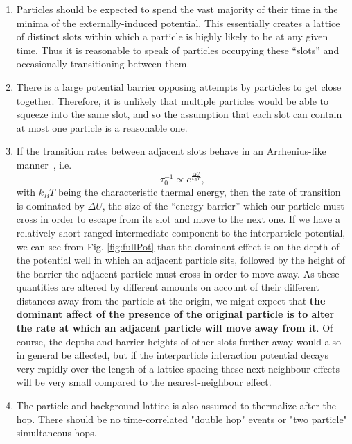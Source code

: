 \begin{enumerate}
\item Particles should be expected to spend the vast majority of their time in the minima of the 
externally-induced potential. This essentially creates a lattice of distinct slots within which a
particle
is highly likely to be at any given time. Thus it is reasonable to speak of particles occupying these 
``slots'' and occasionally transitioning between them.
 \item There is a large potential barrier opposing attempts by particles to get close together. Therefore,
 it is unlikely that multiple particles would be able to squeeze into the same slot,
 and so the assumption that each slot can contain at most one particle is a reasonable one.
 \item If the transition rates between adjacent slots behave in an Arrhenius-like manner~\cite{arrhenius1889, levine2005}, i.e.
 \begin{equation}
  \tau_0^{-1} \propto e^{\frac{\Delta U}{k_B T}},
 \end{equation}
 with $k_B T$ being the characteristic thermal energy,
then the rate of transition is dominated by $\Delta U$, the size of the ``energy barrier'' which
our particle must cross in order to escape from its slot and move to the next one. If we have a relatively
short-ranged intermediate component to the interparticle potential, we can see from Fig. \ref{fig:fullPot}
that the dominant effect is on the depth of the potential well in which an adjacent particle sits, followed
by the height of the barrier the adjacent particle must cross in order to move away. As these
quantities are altered by different amounts on account of their different distances away from the particle
at the origin, we might expect that \textbf{the dominant affect of the presence of the original particle is
to alter the rate at which an adjacent particle will move away from it}. Of course, the depths and barrier
heights of other slots further away would also in general be affected, but if the interparticle interaction potential decays very rapidly over the length of a lattice spacing these next-neighbour effects will be
very small compared to the nearest-neighbour effect.
\item The particle and background lattice is also assumed to thermalize
after the hop. There 
should be no time-correlated "double hop" events or "two particle"
simultaneous hops.
\end{enumerate}

